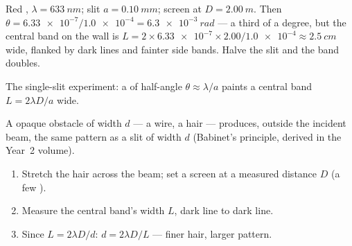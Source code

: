 \begin{example}\label{ex:g12:light-as-wave:slit}
Red , $\lambda = \qty{633}{nm}$; slit $a = \qty{0.10}{mm}$;
screen at $D = \qty{2.00}{m}$. Then $\theta = \num{6.33e-7} /
\num{1.0e-4} = \qty{6.3e-3}{rad}$ --- a third of a degree, but the
central band on the wall is $L = 2 \times \num{6.33e-7} \times 2.00 /
\num{1.0e-4} \approx \qty{2.5}{cm}$ wide, flanked by dark lines and
fainter side bands. Halve the slit and the band doubles.
\end{example}

\begin{omfigure}

{\small The single-slit experiment: a  of half-angle $\theta
\approx \lambda/a$ paints a central band $L = 2\lambda D/a$ wide.}
\end{omfigure}

\begin{proposition}\label{prop:g12:light-as-wave:hair}
A  opaque obstacle of width $d$ --- a wire, a hair --- produces,
outside the incident beam, the same pattern as a slit of width $d$
(Babinet's principle, derived in the Year~2 volume).
\end{proposition}
\admitted

\begin{method}\label{met:g12:light-as-wave:hairwidth}
\begin{enumerate}
  \item Stretch the hair across the  beam; set a screen at a
        measured distance $D$ (a few ).
  \item Measure the central band's width $L$, dark line to dark line.
  \item Since $L = 2\lambda D/d$: $d = 2\lambda D/L$ --- finer hair,
        larger pattern.
\end{enumerate}
\end{method}

